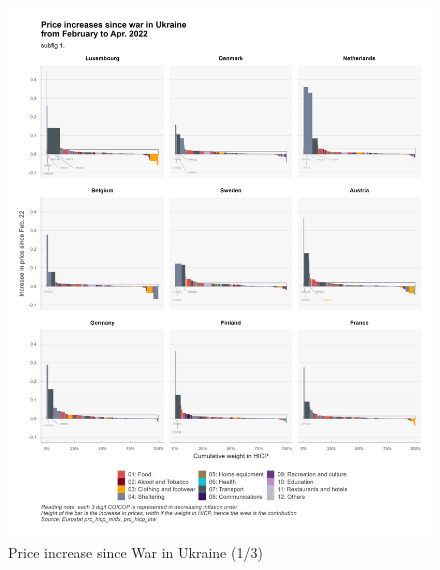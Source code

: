 \documentclass[
  9pt,
  a4paper,
  DIV=11,
  numbers=noendperiod,
  oneside]{scrartcl}
\begin{document}
\begin{figure}

\caption{Price increase since War in Ukraine (1/3)}

{\centering \includegraphics[width=13.5cm,height=\textheight]{../svg/depuis_wiu_1.png}

}

\end{figure}
\end{document}

